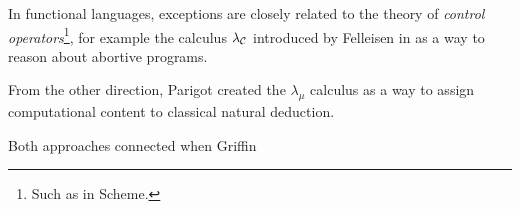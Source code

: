 In functional languages, exceptions are closely related to the theory of
\emph{control operators}\footnote{Such as  in Scheme.},
for example the calculus $\lambda_\mathcal{C}$ introduced by Felleisen in \cite{felleisen87}
as a way to reason about abortive programs.

From the other direction, Parigot created the $\lambda_\mu$ calculus \cite{parigot92}
as a way to assign computational content to classical natural deduction.

Both approaches connected when Griffin \cite{griffin90}



\cite{ariola-herbelin}






































































